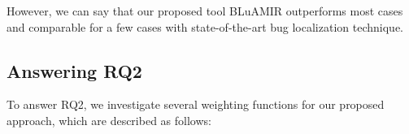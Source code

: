 \documentclass[conference]{IEEEtran}
\begin{document}
\begin{table}[htbp]
	\centering
	\caption{Performance of BLuAMIR on SWT dataset for different weighting values}
	\label{tab:SWTalpha}
	\centering
\end{table}
However, we can say that our proposed tool BLuAMIR outperforms most cases and comparable for a few cases with state-of-the-art bug localization technique.

\subsection{Answering RQ2}\label{RQ2Answer}
To answer RQ2, we investigate several weighting functions for our proposed approach, which are described as follows:
\end{document}
